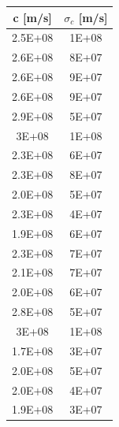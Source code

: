 \documentclass{article}
\begin{document}
            \begin{minipage}{\textwidth}

                \begin{minipage}[b]{0.35\textwidth}

                    \centering
                    \begin{tabular}{c c} 
                        
                        \toprule
                        c [m/s] &  $\sigma_c$ [m/s] \\ 

                        \midrule
                        2.5E+08	&    1E+08 \\
                        2.6E+08	&    8E+07 \\
                        2.6E+08	&    9E+07 \\
                        2.6E+08	&    9E+07 \\
                        2.9E+08	&    5E+07 \\
                        3E+08	&    1E+08 \\
                        2.3E+08	&    6E+07 \\
                        2.3E+08	&    8E+07 \\
                        2.0E+08	&    5E+07 \\
                        2.3E+08	&    4E+07 \\
                        1.9E+08	&    6E+07 \\
                        2.3E+08	&    7E+07 \\
                        2.1E+08	&    7E+07 \\
                        2.0E+08	&    6E+07 \\
                        2.8E+08	&    5E+07 \\
                        3E+08	&    1E+08 \\
                        1.7E+08	&    3E+07 \\
                        2.0E+08	&    5E+07 \\
                        2.0E+08	&    4E+07 \\
                        1.9E+08	&    3E+07 \\
                        \bottomrule

                    \end{tabular}
                    
                    \label{tabular:dati c}


\end{minipage}
\end{minipage}
\end{document}
